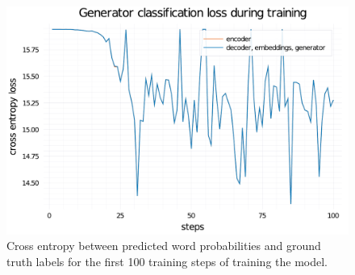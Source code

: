 \begin{figure}
    \centering
    \includegraphics[width=0.7\linewidth]{training-loss-bert-abs-100.pdf}
    \caption{Cross entropy between predicted word probabilities and ground truth labels for the first 100 training steps of training the \BertSumAbs model.}
    \label{training-loss-bert-abs}
\end{figure}
